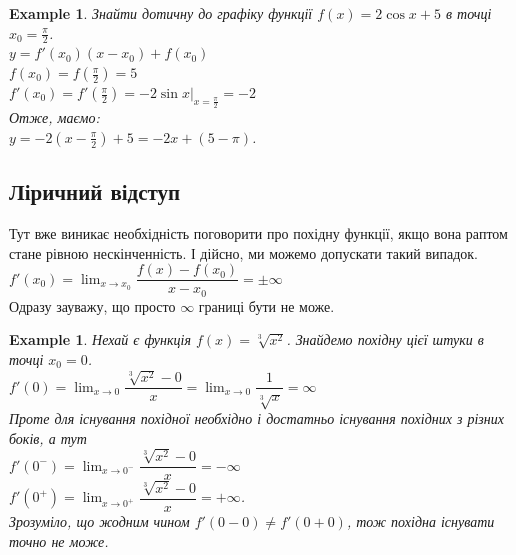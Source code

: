 \documentclass[a4paper, 14pt]{article}
\theoremstyle{theoremdd}
\theoremstyle{theoremdd}
\theoremstyle{theoremdd}
\theoremstyle{theoremdd}
\newtheorem{example}[theorem]{Example}
\theoremstyle{theoremdd}
\theoremstyle{theoremdd}
\theoremstyle{theoremdd}
\theoremstyle{theoremdd}
\begin{document}
\begin{example}
Знайти дотичну до графіку функції $f(x) = 2 \cos x + 5$ в точці $x_0 = \displaystyle \frac{\pi}{2}$.\\
$y = f'(x_0)(x-x_0)+f(x_0)$\\
$f(x_0) = \displaystyle f(\frac{\pi}{2}) = 5$\\
$f'(x_0) = \displaystyle f'(\frac{\pi}{2}) = -2 \sin x |_{x = \frac{\pi}{2}} = -2$\\
Отже, маємо:\\
$y = \displaystyle -2(x-\frac{\pi}{2}) + 5 = -2x + (5 - \pi)$.
\end{example}

\subsection*{Ліричний відступ}
Тут вже виникає необхідність поговорити про похідну функції, якщо вона раптом стане рівною нескінченність. І дійсно, ми можемо допускати такий випадок.\\
$f'(x_0) = \displaystyle \lim_{x \to x_0} \dfrac{f(x)-f(x_0)}{x-x_0} = \pm \infty$\\
Одразу зауважу, що просто $\infty$ границі бути не може.

\begin{example}
Нехай є функція $f(x) = \sqrt[3]{x^2}$. Знайдемо похідну цієї штуки в точці $x_0 = 0$.\\
$f'(0) = \displaystyle \lim_{x \to 0} \dfrac{\sqrt[3]{x^2} - 0}{x} = \lim_{x \to 0} \dfrac{1}{\sqrt[3]{x}} = \infty$\\
Проте для існування похідної необхідно і достатньо існування похідних з різних боків, а тут\\
$f'(0^-) = \displaystyle \lim_{x \to 0^-} \dfrac{\sqrt[3]{x^2} - 0}{x} = -\infty$\\
$f'(0^+) = \displaystyle \lim_{x \to 0^+} \dfrac{\sqrt[3]{x^2} - 0}{x} = +\infty$.\\
Зрозуміло, що жодним чином $f'(0-0) \neq f'(0+0)$, тож похідна існувати точно не може.
\\ %
\end{example}
\end{document}
